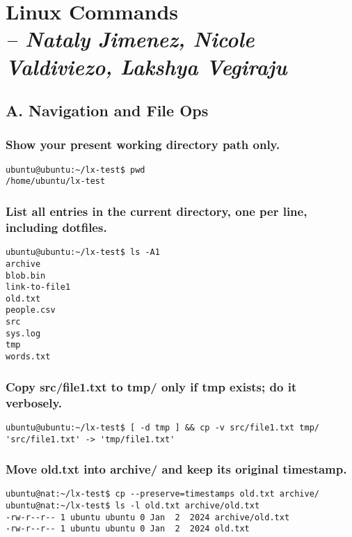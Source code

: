 \chapter{Linux Commands \\
\small{\textit{-- Nataly Jimenez, Nicole Valdiviezo, Lakshya Vegiraju}}
\label{Chapter::Linux Commands}}

\section{A. Navigation and File Ops}
\subsection{Show your present working directory path only.}
\begin{verbatim}
ubuntu@ubuntu:~/lx-test$ pwd
/home/ubuntu/lx-test
\end{verbatim}

\subsection{List all entries in the current directory, one per line, including dotfiles.}

\begin{verbatim}
ubuntu@ubuntu:~/lx-test$ ls -A1
archive
blob.bin
link-to-file1
old.txt
people.csv
src
sys.log
tmp
words.txt
\end{verbatim}

\subsection{ Copy src/file1.txt to tmp/ only if tmp exists; do it verbosely.}
\begin{verbatim}
ubuntu@ubuntu:~/lx-test$ [ -d tmp ] && cp -v src/file1.txt tmp/
'src/file1.txt' -> 'tmp/file1.txt'
\end{verbatim}

\subsection{ Move old.txt into archive/ and keep its original timestamp.}
\begin{verbatim}
ubuntu@nat:~/lx-test$ cp --preserve=timestamps old.txt archive/
ubuntu@nat:~/lx-test$ ls -l old.txt archive/old.txt
-rw-r--r-- 1 ubuntu ubuntu 0 Jan  2  2024 archive/old.txt
-rw-r--r-- 1 ubuntu ubuntu 0 Jan  2  2024 old.txt
\end{verbatim}

